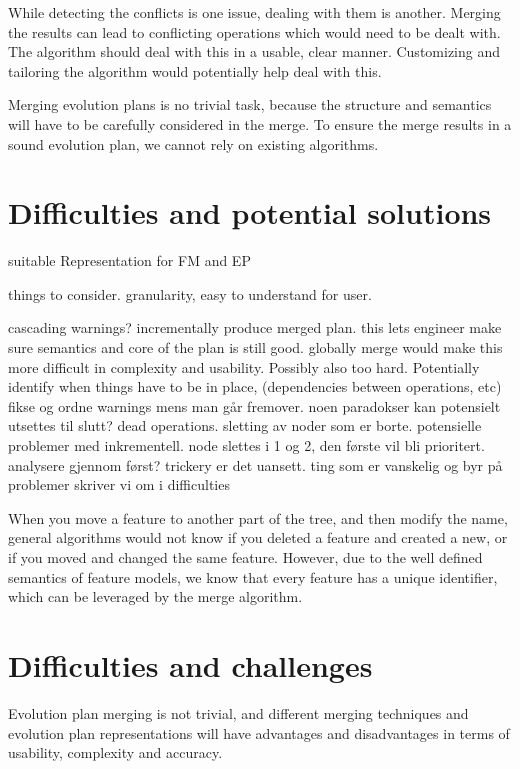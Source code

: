 \documentclass[a4paper,english]{ifimaster}
\begin{document}
While detecting the conflicts is one issue, dealing with them is another. Merging the results can lead to conflicting operations which would need to be dealt with. The algorithm should deal with this in a usable, clear manner. Customizing and tailoring the algorithm would potentially help deal with this.

Merging evolution plans is no trivial task, because the structure and semantics will have to be carefully considered in the merge. To ensure the merge results in a sound evolution plan, we cannot rely on existing algorithms.

\section{Difficulties and potential solutions}%
\label{sec:difficulties_and_potential_solutions}

suitable Representation for FM and EP

things to consider. granularity, easy to understand for user.

cascading warnings?
incrementally produce merged plan. this lets engineer make sure semantics and core of the plan is still good.
globally merge would make this more difficult in complexity and usability. Possibly also too hard. 
Potentially identify when things have to be in place, (dependencies between operations, etc)
fikse og ordne warnings mens man går fremover. noen paradokser kan potensielt utsettes til slutt?
dead operations. sletting av noder som er borte.
potensielle problemer med inkrementell. node slettes i 1 og 2, den første vil bli prioritert.
analysere gjennom først? trickery er det uansett.
ting som er vanskelig og byr på problemer skriver vi om i difficulties

When you move a feature to another part of the tree, and then modify the name, general algorithms would not know if you deleted a feature and created a new, or if you moved and changed the same feature. However, due to the well defined semantics of feature models, we know that every feature has a unique identifier, which can be leveraged by the merge algorithm.


\section{Difficulties and challenges}%
\label{sec:difficulties_challenges}

Evolution plan merging is not trivial, and different merging techniques and evolution plan representations will have advantages and disadvantages in terms of usability, complexity and accuracy.
\end{document}
